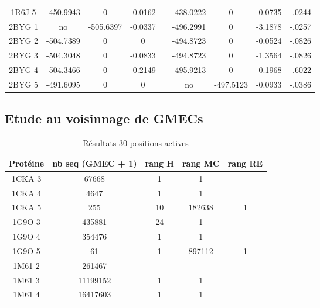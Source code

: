 \documentclass[a4paper,12pt]{book}
\begin{document}
\begin{table}[h]
\begin{tabular}{|c|c|c|c|c|c|c|c|c|}
        1R6J 5 & -450.9943 & 0 & -0.0162 & & -438.0222 & 0 & -0.0735 & -.0244 \\        
        2BYG 1 & no & -505.6397 & -0.0337 & & -496.2991 & 0 & -3.1878 & -.0257 \\        
        2BYG 2 & -504.7389 & 0 & 0 & & -494.8723 & 0 & -0.0524 & -.0826 \\        
        2BYG 3 & -504.3048 & 0 & -0.0833 & & -494.8723 & 0 & -1.3564 & -.0826 \\        
        2BYG 4 & -504.3466 & 0 & -0.2149 & & -495.9213 & 0 & -0.1968 & -.6022 \\        
        2BYG 5 & -491.6095 & 0 & 0 & & no & -497.5123 & -0.0933 & -.0386 \\       
    
    \hline


 \end{tabular}      
 \label{tab_echec_10_20}      
\end{table}





   \subsection{ Etude au voisinnage de GMECs}


    \begin{table}[h]
      \centering

      \begin{tabular}{|c|c|c|c|c|}

        Protéine & nb seq (GMEC + 1) & rang H &rang MC & rang RE \\
        \hline

        1CKA 3 &  67668 & 1 & 1 & \\
        1CKA 4 &  4647 & 1 & 1 & \\
        1CKA 5 &  255 &  10 & 182638 & 1 \\
        1G9O 3 &  435881 & 24 & 1 \\
        1G9O 4 &  354476 & 1 & 1 \\
        1G9O 5 &  61 & 1 & 897112 & 1 \\
        1M61 2 &  261467 &  & \\
        1M61 3 &  11199152 & 1 & 1 &\\
        1M61 4 &  16417603  & 1 & 1 & \\
        \hline


 \end{tabular}      
 \caption{Résultats 30 positions actives }
 \label{tab_echec2BYG__1}      
\end{table}
\end{document}
